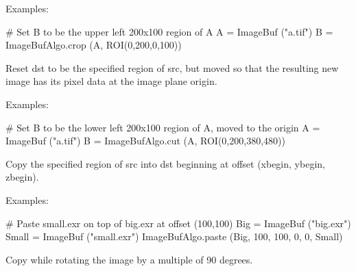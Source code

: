 \smallskip
\noindent Examples:
\begin{code}
    # Set B to be the upper left 200x100 region of A
    A = ImageBuf ("a.tif")
    B = ImageBufAlgo.crop (A, ROI(0,200,0,100))
\end{code}
\apiend


 
Reset {\cf dst} to be the specified region of {\cf src}, but moved so
that the resulting new image has its pixel data at the image plane origin.

\smallskip
\noindent Examples:
\begin{code}
    # Set B to be the lower left 200x100 region of A, moved to the origin
    A = ImageBuf ("a.tif")
    B = ImageBufAlgo.cut (A, ROI(0,200,380,480))
\end{code}
\apiend


 
Copy the specified region of {\cf src} into {\cf dst} beginning at 
offset {\cf (xbegin, ybegin, zbegin)}.

\smallskip
\noindent Examples:
\begin{code}
    # Paste small.exr on top of big.exr at offset (100,100)
    Big = ImageBuf ("big.exr")
    Small = ImageBuf ("small.exr")
    ImageBufAlgo.paste (Big, 100, 100, 0, 0, Small)
\end{code}
\apiend


 
 
 
Copy while rotating the image by a multiple of 90 degrees.

